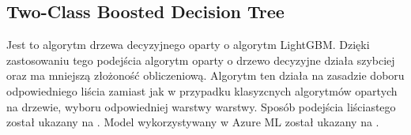 \subsection{Two-Class Boosted Decision Tree}
Jest to algorytm drzewa decyzyjnego oparty o algorytm LightGBM. Dzięki zastosowaniu tego podejścia algorytm oparty o drzewo decyzyjne działa szybciej oraz ma mniejszą złożoność obliczeniową. Algorytm ten działa na zasadzie doboru odpowiedniego liścia zamiast jak w przypadku klasyzcnych algorytmów opartych na drzewie, wyboru odpowiedniej warstwy warstwy\cite{LightGBM}. Sposób podejścia liściastego został ukazany na . Model wykorzystywany w Azure ML został ukazany na .
\begin{figure}[H]
    \begin{subfigure}[m]{0.3\textwidth}
        \centering

\end{subfigure}
\end{figure}
